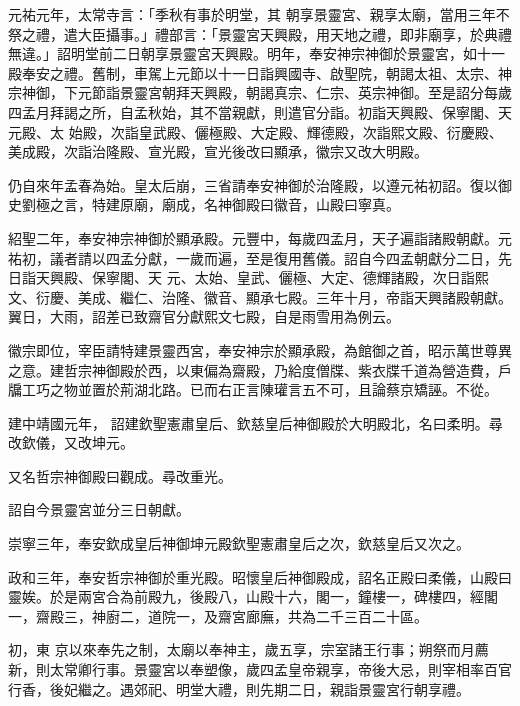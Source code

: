 \begin{pinyinscope}
 元祐元年，太常寺言：「季秋有事於明堂，其
 朝享景靈宮、親享太廟，當用三年不祭之禮，遣大臣攝事。」禮部言：「景靈宮天興殿，用天地之禮，即非廟享，於典禮無違。」詔明堂前二日朝享景靈宮天興殿。明年，奉安神宗神御於景靈宮，如十一殿奉安之禮。舊制，車駕上元節以十一日詣興國寺、啟聖院，朝謁太祖、太宗、神宗神御，下元節詣景靈宮朝拜天興殿，朝謁真宗、仁宗、英宗神御。至是詔分每歲四孟月拜謁之所，自孟秋始，其不當親獻，則遣官分詣。初詣天興殿、保寧閣、天元殿、太
 始殿，次詣皇武殿、儷極殿、大定殿、輝德殿，次詣熙文殿、衍慶殿、美成殿，次詣治隆殿、宣光殿，宣光後改曰顯承，徽宗又改大明殿。



 仍自來年孟春為始。皇太后崩，三省請奉安神御於治隆殿，以遵元祐初詔。復以御史劉極之言，特建原廟，廟成，名神御殿曰徽音，山殿曰寧真。



 紹聖二年，奉安神宗神御於顯承殿。元豐中，每歲四孟月，天子遍詣諸殿朝獻。元祐初，議者請以四孟分獻，一歲而遍，至是復用舊儀。詔自今四孟朝獻分二日，先日詣天興殿、保寧閣、天
 元、太始、皇武、儷極、大定、德輝諸殿，次日詣熙文、衍慶、美成、繼仁、治隆、徽音、顯承七殿。三年十月，帝詣天興諸殿朝獻。翼日，大雨，詔差已致齋官分獻熙文七殿，自是雨雪用為例云。



 徽宗即位，宰臣請特建景靈西宮，奉安神宗於顯承殿，為館御之首，昭示萬世尊異之意。建哲宗神御殿於西，以東偏為齋殿，乃給度僧牒、紫衣牒千道為營造費，戶牖工巧之物並置於荊湖北路。已而右正言陳瓘言五不可，且論蔡京矯誣。不從。



 建中靖國元年，
 詔建欽聖憲肅皇后、欽慈皇后神御殿於大明殿北，名曰柔明。尋改欽儀，又改坤元。



 又名哲宗神御殿曰觀成。尋改重光。



 詔自今景靈宮並分三日朝獻。



 崇寧三年，奉安欽成皇后神御坤元殿欽聖憲肅皇后之次，欽慈皇后又次之。



 政和三年，奉安哲宗神御於重光殿。昭懷皇后神御殿成，詔名正殿曰柔儀，山殿曰靈娭。於是兩宮合為前殿九，後殿八，山殿十六，閣一，鐘樓一，碑樓四，經閣一，齋殿三，神廚二，道院一，及齋宮廊廡，共為二千三百二十區。



 初，東
 京以來奉先之制，太廟以奉神主，歲五享，宗室諸王行事；朔祭而月薦新，則太常卿行事。景靈宮以奉塑像，歲四孟皇帝親享，帝後大忌，則宰相率百官行香，後妃繼之。遇郊祀、明堂大禮，則先期二日，親詣景靈宮行朝享禮。




\end{pinyinscope}
